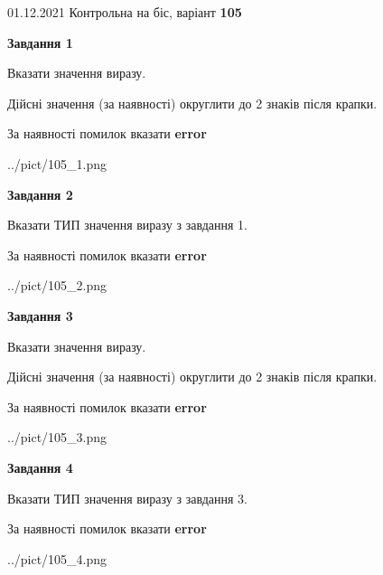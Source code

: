 \documentclass[11pt, ukrainian]{article}
\begin{document}
{01.12.2021 Контрольна на біс, варіант  \No \textbf { 105 }\par}
{
\begin {large}
{\begin {center}\textbf{Завдання 1}\end {center}}\par
Вказати значення виразу. \par
Дійсні значення (за наявності) округлити до 2 знаків після крапки. \par
За наявності помилок вказати \textbf{error}

\begin{center}
	{../pict/105_1.png}
\end{center}
\newpage

{\begin {center}\textbf{Завдання 2}\end {center}}\par
Вказати ТИП значення виразу з завдання 1. \par
За наявності помилок вказати \textbf{error}

\begin{center}
	{../pict/105_2.png}
\end{center}
\newpage

{\begin {center}\textbf{Завдання 3}\end {center}}\par
Вказати значення виразу. \par
Дійсні значення (за наявності) округлити до 2 знаків після крапки. \par
За наявності помилок вказати \textbf{error}

\begin{center}
	{../pict/105_3.png}
\end{center}
\newpage

{\begin {center}\textbf{Завдання 4}\end {center}}\par
Вказати ТИП значення виразу з завдання 3. \par
За наявності помилок вказати \textbf{error}

\begin{center}
	{../pict/105_4.png}
\end{center}
\newpage


\end{large}}
\end{document}
